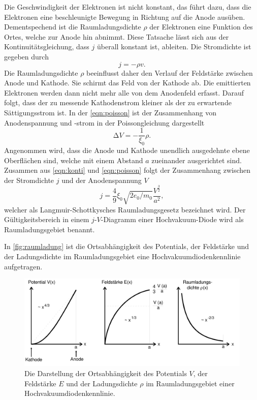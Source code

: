 Die Geschwindigkeit der Elektronen ist nicht konstant, das führt dazu, dass die Elektronen
eine beschleunigte Bewegung in Richtung auf die Anode ausüben. Dementspechend ist die Raumladungsdichte $\rho$
der Elektronen eine Funktion des Ortes, welche zur Anode hin abnimmt.  Diese Tatsache lässt sich aus der
Kontinuitätsgleichung, dass $j$ überall konstant ist, ableiten.
Die Stromdichte ist gegeben durch
\begin{equation}
    j = - \rho v .
\label{eqn:konti}
\end{equation}
Die Raumladungsdichte $\rho$ beeinflusst daher den Verlauf der Feldstärke zwischen Anode und Kathode.
Sie schirmt das Feld von der Kathode ab. Die emittierten Elektronen werden dann nicht mehr alle von dem
Anodenfeld erfasst. Darauf folgt, dass der zu messende Kathodenstrom kleiner als der zu erwartende Sättigungsstrom ist.
In der \autoref{eqn:poisson} ist der Zusammenhang von Anodenspannung und -strom in der Poissongleichung dargestellt
\begin{equation}
    \increment V = - \frac{1}{\xi_0}\rho .
    \label{eqn:poisson}
\end{equation} 
Angenommen wird, dass die Anode und Kathode unendlich ausgedehnte ebene Oberflächen sind, welche
mit einem Abstand $a$ zueinander ausgerichtet sind.
Zusammen aus \autoref{eqn:konti} und \autoref{eqn:poisson} folgt der Zusammenhang
zwischen der Stromdichte $j$ und der Anodenspannung $V$
\begin{equation}
    j = \frac{4}{9} \xi_0 \sqrt{2 e_0/m_0} \frac{V^{\frac{3}{2}}}{a^2} ,
\label{eqn:langmuir}
\end{equation}
welcher als Langmuir-Schottkysches Raumladungsgesetz bezeichnet wird. Der Gültigkeitsbereich 
in einem $j$-$V$-Diagramm einer Hochvakuum-Diode wird als Raumladungsgebiet benannt.

In \autoref{fig:raumladung} ist die Ortsabhängigkeit des Potentials, der Feldstärke und der Ladungsdichte im Raumladungsgebiet
eine Hochvakuumdiodenkennlinie aufgetragen.

\begin{figure}[H]
    \centering
    \includegraphics[width=0.5\linewidth]{content/grafik/raumladung.png}
    \caption{Die Darstellung der Ortsabhängigkeit des Potentials $V$, der Feldstärke $E$ und der Ladungsdichte $\rho$ im
    Raumladungsgebiet einer Hochvakuumdiodenkennlinie.\cite{elektron}}
    \label{fig:raumladung}
\end{figure}

